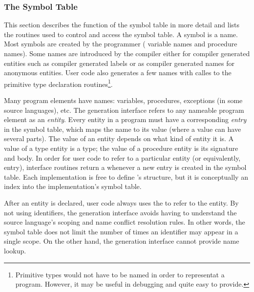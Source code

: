 
\subsubsection{The Symbol Table}\label{sec:symbolTable}

This section describes the function of the symbol table in more detail
and lists the routines used to control and access the symbol table.  A
symbol is a name.  Most symbols are created by the programmer (\eg
variable names and procedure names).  Some names are introduced by the
compiler either for compiler generated entities such as compiler
generated labels or as compiler generated names for anonymous entities.
User code also generates a few names with calles to the primitive type
declaration routines\footnote{Primitive types would not have to be
named in order to representat a program.  However, it may be useful in
debugging and quite easy to provide.}.

Many program elements have names: variables, procedures, exceptions
(in some source languages), etc.  The generation interface refers to
any nameable program element as an \emph{entity}.  Every entity in a
program must have a corresponding \emph{entry} in the symbol table,
which maps the name to its value (where a value can have several
parts).  The value of an entity depends on what kind of entity it is.
A value of a type entity is a type; the value of a procedure entity is
its signature and body.  In order for user code to refer to a particular
entity (or equivalently, entry), interface routines return a
 whenever a new entry is created in the symbol table.
Each implementation is free to define 's structure, but it
is conceptually an index into the implementation's symbol table.

After an entity is declared, user code always uses the  to
refer to the entity.  By not using identifiers, the generation
interface avoids having to understand the source language's scoping
and name conflict resolution rules.  In other words, the symbol table
does not limit the number of times an identifier may appear in a
single scope.  On the other hand, the generation interface cannot
provide name lookup.

